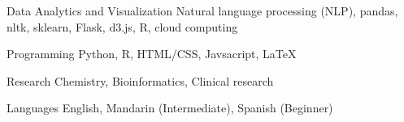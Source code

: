 

\begin{cvskills}

  \cvskill
    {Data Analytics and Visualization} %
    {Natural language processing (NLP), pandas, nltk, sklearn, Flask, d3.js, R, cloud computing} %

  \cvskill
    {Programming} %
    {Python, R, HTML/CSS, Javsacript, LaTeX} %

  \cvskill
    {Research} %
    {Chemistry, Bioinformatics, Clinical research} %
    
  \cvskill
    {Languages} %
    {English, Mandarin (Intermediate), Spanish (Beginner)} %

\end{cvskills}
